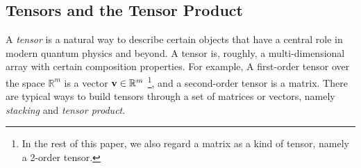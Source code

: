 

\subsection{Tensors and the Tensor Product}

A \emph{tensor} is a natural way to describe certain objects that have a central role in modern quantum physics and beyond.  
A tensor is, roughly, a multi-dimensional array with certain composition properties. For example, A first-order tensor over the space
$\mathbb{R}^m$ is a vector ${\bf{v}} \in \mathbb{R}^{m}$ \footnote{In the rest of this paper, we also regard a matrix as a kind of tensor, namely  a 2-order tensor.}, and a second-order tensor is a matrix.  There are typical ways to build tensors through a set of matrices or vectors, namely \textit{stacking} and \textit{tensor product}.

